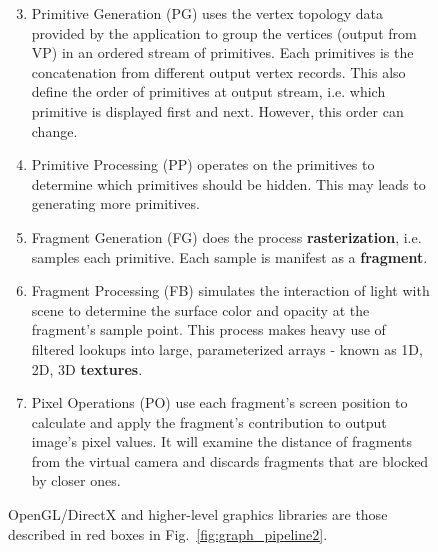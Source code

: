 \begin{figure}

  \begin{minipage}[b]{0.5\linewidth} 

    \begin{enumerate}
      \setcounter{enumi}{2}
    \item Primitive Generation (PG) uses the vertex topology data provided
      by the application to group the vertices (output from VP) in an
      ordered stream of primitives. Each primitives is the concatenation
      from different output vertex records. This also define the order of
      primitives at output stream, i.e. which primitive is displayed first
      and next. However, this order can change. 

    \item Primitive Processing (PP) operates on the primitives to
      determine which primitives should be hidden. This may leads to
      generating more primitives. 

    \item Fragment Generation (FG) does the process {\bf rasterization},
      i.e. samples each primitive. Each sample is manifest as a {\bf
        fragment}. 
    \item Fragment Processing (FB) simulates the interaction of light with
      scene to determine the surface color and opacity at the fragment's
      sample point. This process makes heavy use of filtered lookups into
      large, parameterized arrays - known as 1D, 2D, 3D {\bf textures}. 

    \item Pixel Operations (PO) use each fragment's screen position to
      calculate and apply the fragment's contribution to output image's
      pixel values. It will examine the distance of fragments from the
      virtual camera and discards fragments that are blocked by closer
      ones. 

    \end{enumerate}
OpenGL/DirectX and
higher-level graphics libraries are those described in red boxes in
Fig.~\ref{fig:graph_pipeline2}. 


\end{minipage}
\end{figure}
